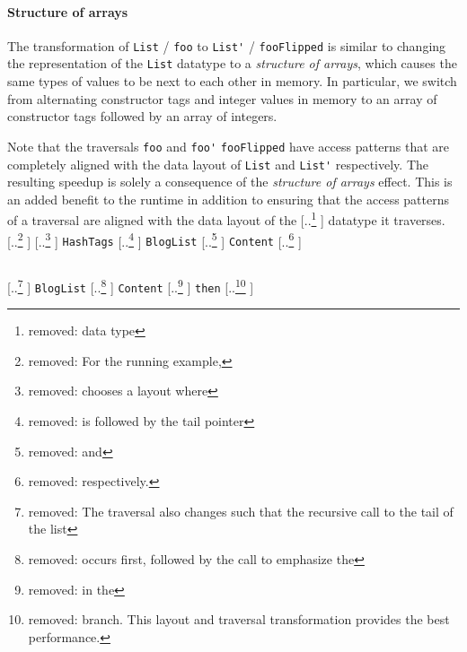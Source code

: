 \documentclass[acmsmall,review,anonymous]{acmart}\settopmatter{printfolios=true,printccs=false,printacmref=false}
\newcommand{\system}{{\sc Marmoset}\xspace}
\providecommand{\DIFaddtex}[1]{{\protect\color{blue} \sf #1}} %
\providecommand{\DIFdeltex}[1]{{\protect\color{red} [..\footnote{removed: #1} ]}} %
\providecommand{\DIFaddbegin}{} %
\providecommand{\DIFaddend}{} %
\providecommand{\DIFdelbegin}{} %
\providecommand{\DIFdelend}{} %
\providecommand{\DIFmodbegin}{} %
\providecommand{\DIFmodend}{} %
\providecommand{\DIFadd}[1]{\texorpdfstring{\DIFaddtex{#1}}{#1}} %
\providecommand{\DIFdel}[1]{\texorpdfstring{\DIFdeltex{#1}}{}} %
\newcommand{\DIFscaledelfig}{0.5}
\newlength{\DIFdelgraphicswidth} %
\newlength{\DIFdelgraphicsheight} %
\newcommand{\DIFaddincludegraphics}[2][]{{\color{blue}\fbox{\DIFOincludegraphics[#1]{#2}}}} %
\newcommand{\DIFdelincludegraphics}[2][]{%
\sbox{\DIFdelgraphicsbox}{\DIFOincludegraphics[#1]{#2}}%
\settoboxwidth{\DIFdelgraphicswidth}{\DIFdelgraphicsbox} %
\settoboxtotalheight{\DIFdelgraphicsheight}{\DIFdelgraphicsbox} %
\scalebox{\DIFscaledelfig}{%
\parbox[b]{\DIFdelgraphicswidth}{\usebox{\DIFdelgraphicsbox}\\[-\baselineskip] \rule{\DIFdelgraphicswidth}{0em}}\llap{\resizebox{\DIFdelgraphicswidth}{\DIFdelgraphicsheight}{%
\setlength{\unitlength}{\DIFdelgraphicswidth}%
\begin{picture}(1,1)%
\thicklines\linethickness{2pt} %
{\color[rgb]{1,0,0}\put(0,0){\framebox(1,1){}}}%
{\color[rgb]{1,0,0}\put(0,0){\line( 1,1){1}}}%
{\color[rgb]{1,0,0}\put(0,1){\line(1,-1){1}}}%
\end{picture}%
}\hspace*{3pt}}} %
} %
\DeclareRobustCommand{\DIFaddbegin}{\DIFOaddbegin \let\includegraphics\DIFaddincludegraphics} %
\DeclareRobustCommand{\DIFaddend}{\DIFOaddend \let\includegraphics\DIFOincludegraphics} %
\DeclareRobustCommand{\DIFdelbegin}{\DIFOdelbegin \let\includegraphics\DIFdelincludegraphics} %
\DeclareRobustCommand{\DIFdelend}{\DIFOaddend \let\includegraphics\DIFOincludegraphics} %
\begin{document}
\paragraph{\DIFadd{Structure of arrays}}
\DIFadd{The transformation of
}{\color{blue}%
\lstinline|List|%
}%
\DIFadd{/}{\color{blue}%
\lstinline|foo| %
}%
\DIFadd{to }{\color{blue}%
\lstinline|List'|%
}%
\DIFadd{/}{\color{blue}%
\lstinline|fooFlipped|
%
}%
\DIFadd{is similar to
changing the representation of the }{\color{blue}%
\lstinline|List| %
}%
\DIFadd{datatype to a
\textit{structure of arrays}, which causes the same types of values to be next to each other in memory.
In particular, we switch from alternating constructor tags and integer values in memory to
an array of constructor tags followed by an array of integers.
}

\DIFaddend Note that the traversals \lstinline|foo| and \DIFdelbegin %
{\color{red}%
\lstinline|foo'| %
}%
\DIFdelend \DIFaddbegin {\color{blue}%
\lstinline|fooFlipped| %
}%
\DIFaddend have access
patterns that are completely aligned with the data layout of \lstinline|List| and \lstinline|List'| respectively. The resulting speedup 
is solely a consequence of the \textit{structure of arrays} effect. This is an added benefit to the runtime in addition to ensuring that the 
access patterns of a traversal are aligned with the data layout of the \DIFdelbegin \DIFdel{data type }\DIFdelend \DIFaddbegin \DIFadd{datatype }\DIFaddend it traverses.
\DIFdelbegin \DIFdel{For the running example, }%
\DIFdel{chooses
a layout where }%
{\color{red}%
\lstinline|HashTags| %
}%
\DIFdel{is followed by the tail pointer }%
{\color{red}%
\lstinline|BlogList| %
}%
\DIFdel{and }%
{\color{red}%
\lstinline|Content| %
}%
\DIFdel{respectively.
}%
\DIFmodbegin
\begin{lstlisting}[alsolanguage=DIFcode]
%DIF <     data BlogList = Nil | Blog HashTags BlogList Content
\end{lstlisting}
\DIFmodend %
\DIFdel{The traversal also changes such that the recursive call to the tail of the list }%
{\color{red}%
\lstinline|BlogList| %
}%
\DIFdel{occurs first, followed by the call to emphasize
the }%
{\color{red}%
\lstinline|Content| %
}%
\DIFdel{in the }%
{\color{red}%
\lstinline|then| %
}%
\DIFdel{branch. This layout and traversal transformation provides the best performance. 
}\DIFdelend 
\end{document}
